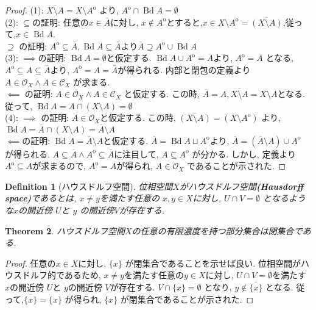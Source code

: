 \documentclass[lualatex]{ltjsbook}
\newcommand{\cl}[1]{\overline{ #1}  }
\newcommand{\Int}[1]{#1 ^{\mathrm{o}} }
\newcommand{\bd}[1]{\operatorname{Bd}{#1}}
\newtheorem{theorem}{Theorem}[section]
\newtheorem{definition}[theorem]{Definition}
\theoremstyle{remark}
\theoremstyle{plain}
\begin{document}
\begin{proof}
	(1): $\cl{X\setminus A}= X\setminus \Int{ A }$ より, $\Int{A} \cap \bd{A}= \emptyset$\\
	(2): $\subseteq$の証明: 任意の$x \in \cl{A}$に対し,  $x \not\in \Int{A}$とすると,$ x \in X \setminus \Int{A} = \cl{\left( X \setminus A \right) }$,従って,$x \in \bd{A}.$\\
	$\supseteq$ の証明: $\Int{A} \subseteq \cl{A}, \bd{A} \subseteq \cl{A}$より$\cl{A} \supseteq \Int{A} \cup \bd{A}$ \\
	(3): $\implies$の証明: $\bd{A} = \emptyset$と仮定する. $\bd{A} \cup \Int{A} = \cl{A} $より,  $\Int{A} = \cl{A}$ となる, $\Int{A} \subseteq A \subseteq \cl{A}$より, $\Int{A} =A = \cl{A}$が得られる. 内部と閉包の定義より $A \in \mathcal{O}_X \land A \in \mathcal{C}_X$ が求まる.\\
	$\impliedby$ の証明: $A \in \mathcal{O}_X \land A \in \mathcal{C}_X$ と仮定する. この時, $\cl{A} = A, \cl{X\setminus A } = X \setminus A$となる.
	従って, $\bd{A} = A \cap \left( X \setminus A \right) = \emptyset$ \\
	(4): $\implies$ の証明: $A \in \mathcal{O}_X $と仮定する. この時, $\cl{\left( X \setminus A \right) } = \left( X \setminus \Int A \right)  $ より, $\bd{A} = \cl{A} \cap \left( X \setminus A \right) = \cl{A} \setminus A$ \\
	$\impliedby$の証明: $\bd{A} = \cl{A} \setminus A$と仮定する. 
	$\cl{A} = \bd{A} \sqcup \Int{A}$より, $\cl{A} = \left( \cl{A} \setminus A  \right) \cup \Int{A}$ が得られる. 
	$A \subseteq \cl{A} \land \Int{A} \subseteq \cl{A}$に注目して,  $ A \subseteq  \Int{A} $ が分かる. 
	しかし, 定義より$\Int{A} \subseteq A$が求まるので,  $\Int{A} = A$が得られ,  $A \in \mathcal{O}_X$ であることが示された.
	
\end{proof}


\begin{definition}[ハウスドルフ空間]
	位相空間$X$がハウスドルフ空間\textbf{(Hausdorff space)}であるとは, $x\neq y$を満たす任意の $x,y \in X$に対し,  $U \cap V = \emptyset $ となるような$x$の開近傍 $U$と $y$ の開近傍$V$が存在する.
\end{definition}

\begin{theorem}
	ハウスドルフ空間$X$の任意の有限濃度を持つ部分集合は閉集合である.
\end{theorem}

\begin{proof}
	任意の$x \in X$に対し,  $\{x\} $ が閉集合であることを示せば良い.
	位相空間がハウスドルフ的であるため, $x \neq y$を満たす任意の$y \in X$に対し,  $U \cap V =\emptyset$を満たす $x$の開近傍 $U$と $y$の開近傍 $V$が存在する.
	$V \cap \{x\} = \emptyset $ となり, $y \not\in \cl{\{x\} } $ となる. 
	従って,$\cl{\{x\} } = \{x\}  $ が得られ, $\{x\} $ が閉集合であることが示された.
\end{proof}
\end{document}

